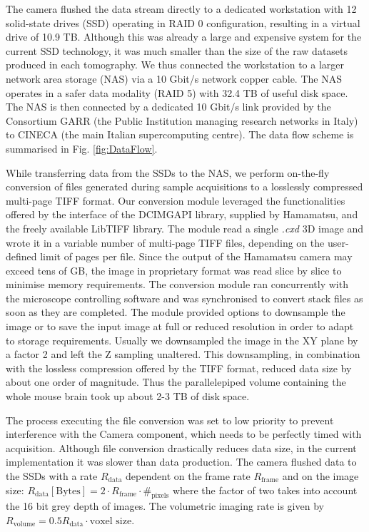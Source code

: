 \documentclass[12pt]{spieman}  %
\begin{document}
\begin{spacing}{2}
The camera flushed the data stream directly to a dedicated workstation with 12 solid-state drives (SSD) operating in RAID 0 configuration, resulting in a virtual drive of 10.9 TB. Although this was already a large and expensive system for the current SSD technology, it was much smaller than the size of the raw datasets produced in each tomography. We thus connected the workstation to a larger network area storage (NAS) via a 10 Gbit/s network copper cable. The NAS operates in a safer data modality (RAID 5) with 32.4 TB of useful disk space. The NAS is then connected by a dedicated 10 Gbit/s link provided by the Consortium GARR (the Public Institution managing research networks in Italy) to CINECA (the main Italian supercomputing centre). The data flow scheme is summarised in Fig. \ref{fig:DataFlow}.

While transferring data from the SSDs to the NAS, we perform on-the-fly conversion of files generated during sample acquisitions to a losslessly compressed multi-page TIFF format. Our conversion module leveraged the functionalities offered by the interface of the DCIMGAPI library, supplied by Hamamatsu, and the freely available LibTIFF library. The module read a single \textit{.cxd} 3D image and wrote it in a variable number of multi-page TIFF files, depending on the user-defined limit of pages per file. Since the output of the Hamamatsu camera may exceed tens of GB, the image in proprietary format was read slice by slice to minimise memory requirements. The conversion module ran concurrently with the microscope controlling software and was synchronised to convert stack files as soon as they are completed. The module provided options to downsample the image or to save the input image at full or reduced resolution in order to adapt to storage requirements. Usually we downsampled the image in the XY plane by a factor 2 and left the Z sampling unaltered. This downsampling, in combination with the lossless compression offered by the TIFF format, reduced data size by about one order of magnitude. Thus the parallelepiped volume containing the whole mouse brain took up about 2-3 TB of disk space. 

The process executing the file conversion was set to low priority to prevent interference with the Camera component, which needs to be perfectly timed with acquisition. Although file conversion drastically reduces data size, in the current implementation it was slower than data production. The camera flushed data to the SSDs with a rate $R_{\text{data}}$ dependent on the frame rate $R_{\text{frame}}$ and on the image size: $R_{\text{data}} [\text{Bytes}] = 2\cdot R_{\text{frame}} \cdot \#_{\text{pixels}}$
where the factor of two takes into account the 16 bit grey depth of images. The volumetric imaging rate is given by $R_{\text{volume}} = 0.5 R_{\text{data}} \cdot \text{voxel size}$.


\end{spacing}
\end{document}
